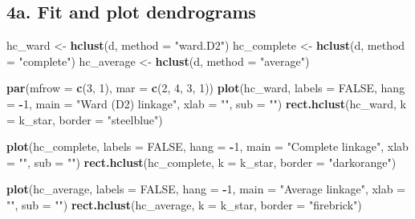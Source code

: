 \documentclass[
]{article}
\newenvironment{Shaded}{\begin{snugshade}}{\end{snugshade}}
\newcommand{\AttributeTok}[1]{\textcolor[rgb]{0.13,0.29,0.53}{#1}}
\newcommand{\ConstantTok}[1]{\textcolor[rgb]{0.56,0.35,0.01}{#1}}
\newcommand{\DecValTok}[1]{\textcolor[rgb]{0.00,0.00,0.81}{#1}}
\newcommand{\FunctionTok}[1]{\textcolor[rgb]{0.13,0.29,0.53}{\textbf{#1}}}
\newcommand{\NormalTok}[1]{#1}
\newcommand{\OtherTok}[1]{\textcolor[rgb]{0.56,0.35,0.01}{#1}}
\newcommand{\SpecialCharTok}[1]{\textcolor[rgb]{0.81,0.36,0.00}{\textbf{#1}}}
\newcommand{\StringTok}[1]{\textcolor[rgb]{0.31,0.60,0.02}{#1}}
\begin{document}
\subsection{4a. Fit and plot
dendrograms}\label{a.-fit-and-plot-dendrograms}

\begin{Shaded}
\begin{Highlighting}[]
\NormalTok{hc\_ward     }\OtherTok{\textless{}{-}} \FunctionTok{hclust}\NormalTok{(d, }\AttributeTok{method =} \StringTok{"ward.D2"}\NormalTok{)}
\NormalTok{hc\_complete }\OtherTok{\textless{}{-}} \FunctionTok{hclust}\NormalTok{(d, }\AttributeTok{method =} \StringTok{"complete"}\NormalTok{)}
\NormalTok{hc\_average  }\OtherTok{\textless{}{-}} \FunctionTok{hclust}\NormalTok{(d, }\AttributeTok{method =} \StringTok{"average"}\NormalTok{)}
\end{Highlighting}
\end{Shaded}

\begin{Shaded}
\begin{Highlighting}[]
\FunctionTok{par}\NormalTok{(}\AttributeTok{mfrow =} \FunctionTok{c}\NormalTok{(}\DecValTok{3}\NormalTok{, }\DecValTok{1}\NormalTok{), }\AttributeTok{mar =} \FunctionTok{c}\NormalTok{(}\DecValTok{2}\NormalTok{, }\DecValTok{4}\NormalTok{, }\DecValTok{3}\NormalTok{, }\DecValTok{1}\NormalTok{))}
\FunctionTok{plot}\NormalTok{(hc\_ward,     }\AttributeTok{labels =} \ConstantTok{FALSE}\NormalTok{, }\AttributeTok{hang =} \SpecialCharTok{{-}}\DecValTok{1}\NormalTok{,}
     \AttributeTok{main =} \StringTok{"Ward (D2) linkage"}\NormalTok{,     }\AttributeTok{xlab =} \StringTok{""}\NormalTok{, }\AttributeTok{sub =} \StringTok{""}\NormalTok{)}
\FunctionTok{rect.hclust}\NormalTok{(hc\_ward, }\AttributeTok{k =}\NormalTok{ k\_star, }\AttributeTok{border =} \StringTok{"steelblue"}\NormalTok{)}

\FunctionTok{plot}\NormalTok{(hc\_complete, }\AttributeTok{labels =} \ConstantTok{FALSE}\NormalTok{, }\AttributeTok{hang =} \SpecialCharTok{{-}}\DecValTok{1}\NormalTok{,}
     \AttributeTok{main =} \StringTok{"Complete linkage"}\NormalTok{,      }\AttributeTok{xlab =} \StringTok{""}\NormalTok{, }\AttributeTok{sub =} \StringTok{""}\NormalTok{)}
\FunctionTok{rect.hclust}\NormalTok{(hc\_complete, }\AttributeTok{k =}\NormalTok{ k\_star, }\AttributeTok{border =} \StringTok{"darkorange"}\NormalTok{)}

\FunctionTok{plot}\NormalTok{(hc\_average,  }\AttributeTok{labels =} \ConstantTok{FALSE}\NormalTok{, }\AttributeTok{hang =} \SpecialCharTok{{-}}\DecValTok{1}\NormalTok{,}
     \AttributeTok{main =} \StringTok{"Average linkage"}\NormalTok{,       }\AttributeTok{xlab =} \StringTok{""}\NormalTok{, }\AttributeTok{sub =} \StringTok{""}\NormalTok{)}
\FunctionTok{rect.hclust}\NormalTok{(hc\_average,  }\AttributeTok{k =}\NormalTok{ k\_star, }\AttributeTok{border =} \StringTok{"firebrick"}\NormalTok{)}
\end{Highlighting}
\end{Shaded}
\end{document}
